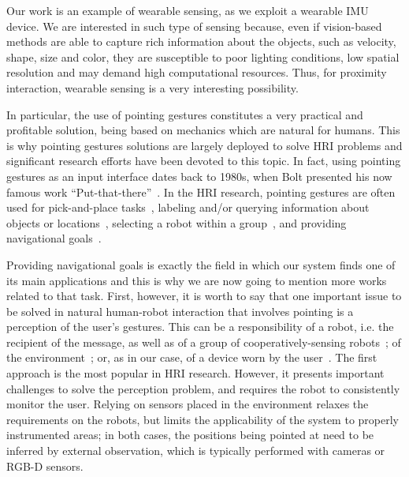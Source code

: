 Our work is an example of wearable sensing, as we exploit a wearable \ac{IMU} device. We are interested in such type of sensing because, even if vision-based methods are able to capture rich information about the objects, such as velocity, shape, size and color, they are susceptible to poor lighting conditions, low spatial resolution and may demand high computational resources.
Thus, for proximity interaction, wearable sensing is a very interesting possibility.

In particular, the use of pointing gestures constitutes a very practical and profitable solution, being based on mechanics which are natural for humans. This is why pointing gestures solutions are largely deployed to solve \ac{HRI} problems and significant research efforts have been devoted to this topic.
In fact, using pointing gestures as an input interface dates back to 1980s, when Bolt presented his now famous work ``Put-that-there''~\cite{Bolt1980}.
In the \ac{HRI} research, pointing gestures are often used for pick-and-place tasks~\cite{Brooks2006,Droeschel2011,Grossmann2014,Cosgun2015}, labeling and/or querying information about objects or locations~\cite{Brooks2006,Pateraki2014,Akkil2016}, selecting a robot within a group~\cite{Nagi2014a,Pourmehr2013}, and providing navigational goals~\cite{VanDenBergh2011,Abidi2013,Wolf2013,Jevtic2015,Gromov2016,Tolgyessy2017}.

Providing navigational goals is exactly the field in which our system finds one of its main applications and this is why we are now going to mention more works related to that task. First, however, it is worth to say that one important issue to be solved in natural human-robot interaction that involves pointing is a perception of the user's gestures. This can be a responsibility of a robot, i.e. the recipient of the message, as well as of a group of cooperatively-sensing robots~\cite{Giusti2012,Pourmehr2013}; of the environment~\cite{zivkovic2008toward}; or, as in our case, of a device worn by the user~\cite{Sugiyama2013,Wolf2013,Gromov2016}. The first approach is the most popular in \ac{HRI} research. However, it presents important challenges to solve the perception problem, and requires the robot to consistently monitor the user. Relying on sensors placed in the environment relaxes the requirements on the robots, but limits the applicability of the system to properly instrumented areas; in both cases, the positions being pointed at need to be inferred by external observation, which is typically performed with cameras or \acs{RGB-D} sensors.

